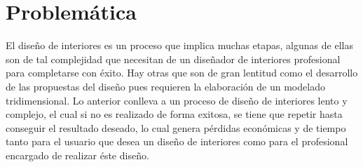 \section{Problemática}
El diseño de interiores es un proceso que implica muchas etapas, algunas de ellas son de tal complejidad que necesitan de un diseñador de interiores profesional para completarse con éxito. Hay otras que son de gran lentitud como el desarrollo de las propuestas del diseño pues requieren la elaboración de un modelado tridimensional. Lo anterior conlleva a un proceso de diseño de interiores lento y complejo, el cual si no es realizado de forma exitosa, se tiene que repetir hasta conseguir el resultado deseado, lo cual genera pérdidas económicas y de tiempo tanto para el usuario que desea un diseño de interiores como para el profesional encargado de realizar éste diseño.

   